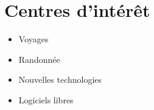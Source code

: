 \section*{Centres d'intérêt}
\begin{itemize}
  \item {Voyages}
  \item {Randonnée}
  \item {Nouvelles technologies}
  \item {Logiciels libres}
\end{itemize}
